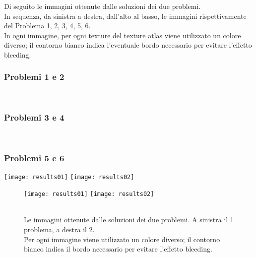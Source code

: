 Di seguito le immagini ottenute dalle soluzioni dei due problemi. \\
In sequenza, da sinistra a destra, dall'alto al basso, le immagini rispettivamente del Problema 1, 2, 3, 4, 5, 6. \\
 In ogni immagine, per ogni texture del texture atlas viene utilizzato un colore diverso; il contorno bianco indica l'eventuale bordo necessario per evitare l'effetto bleeding. 
\subsubsection{Problemi 1 e 2}
\\
\subsubsection{Problemi 3 e 4}
 \\
\subsubsection{Problemi 5 e 6}




\iffalse
\newpage
{\centering
	\texttt{[image: results01]}
	\hspace{1cm}
	\texttt{[image: results02]}
	\caption{\\Le immagini ottenute dalle soluzioni dei due problemi. 
	 A sinistra il 1\degree{} problema, a destra il 2\degree. \\
	 { %
	 Per ogni immagine viene utilizzato un colore diverso; il contorno bianco indica il bordo necessario per evitare l'effetto bleeding.
	 } } }
\begin{figure}[h!]
{\centering
	\texttt{[image: results01]}
	\hspace{1cm}
	\texttt{[image: results02]}
	\caption{\\Le immagini ottenute dalle soluzioni dei due problemi. 
	 A sinistra il 1\degree{} problema, a destra il 2\degree. \\
	 { %
	 Per ogni immagine viene utilizzato un colore diverso; il contorno bianco indica il bordo necessario per evitare l'effetto bleeding.
	 } } }
\end{figure}


